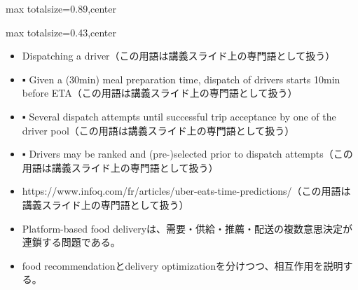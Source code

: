 \begin{minipage}[t]{0.58\textwidth}
\begin{adjustbox}{max totalsize={\textwidth}{0.89\textheight},center}
\begin{minipage}{\textwidth}
\end{minipage}
\end{adjustbox}
\end{minipage}


\clearpage
{}
\begin{minipage}[t]{0.405\textwidth}
\begin{adjustbox}{max totalsize={\textwidth}{0.43\textheight},center}
\begin{minipage}{\textwidth}\scriptsize
{}\begin{itemize}
\item Dispatching a driver（この用語は講義スライド上の専門語として扱う）
\item ▪ Given a (30min) meal preparation time, dispatch of drivers starts 10min before ETA（この用語は講義スライド上の専門語として扱う）
\item ▪ Several dispatch attempts until successful trip acceptance by one of the driver pool（この用語は講義スライド上の専門語として扱う）
\item ▪ Drivers may be ranked and (pre-)selected prior to dispatch attempts（この用語は講義スライド上の専門語として扱う）
\item https://www.infoq.com/fr/articles/uber-eats-time-predictions/（この用語は講義スライド上の専門語として扱う）
\end{itemize}\begin{itemize}
\item Platform-based food deliveryは、需要・供給・推薦・配送の複数意思決定が連鎖する問題である。
\item food recommendationとdelivery optimizationを分けつつ、相互作用を説明する。
\end{itemize}
\end{minipage}
\end{adjustbox}
\end{minipage}\hfill
